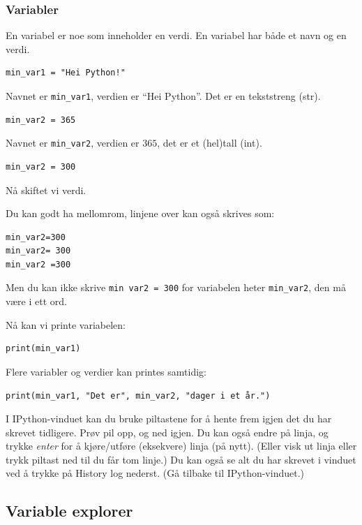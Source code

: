 \subsubsection{Variabler}
En variabel er noe som inneholder en verdi. En variabel har både et navn og en verdi.

\begin{lstlisting}
min_var1 = "Hei Python!"
\end{lstlisting}

Navnet er \lstinline{min_var1}, verdien er ``Hei Python''. Det er en tekststreng (str). 

\begin{lstlisting}
min_var2 = 365
\end{lstlisting}

Navnet er \lstinline{min_var2}, verdien er $365$, det er et (hel)tall (int). 

\begin{lstlisting}
min_var2 = 300
\end{lstlisting}

Nå skiftet vi verdi. 

Du kan godt ha mellomrom, linjene over kan også skrives som: 
\begin{lstlisting}
min_var2=300
min_var2= 300
min_var2 =300
\end{lstlisting}

Men du kan ikke skrive \verb|min var2 = 300| for variabelen heter \lstinline{min_var2}, den må være i ett ord. 

Nå kan vi printe variabelen:
\begin{lstlisting}
print(min_var1)
\end{lstlisting}
Flere variabler og verdier kan printes samtidig:
\begin{lstlisting}
print(min_var1, "Det er", min_var2, "dager i et år.")
\end{lstlisting}

I IPython-vinduet kan du bruke piltastene for å hente frem igjen det du har skrevet tidligere. Prøv pil opp, og ned igjen. Du kan også endre på linja, og trykke {\em enter} for å kjøre/utføre (eksekvere) linja (på nytt). (Eller visk ut linja eller trykk piltast ned til du får tom linje.) Du kan også se alt du har skrevet i vinduet ved å trykke på History log nederst. (Gå tilbake til IPython-vinduet.) 

\subsection{Variable explorer}

